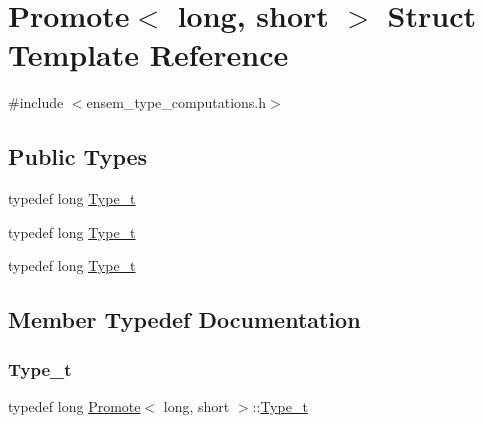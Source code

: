 \hypertarget{structPromote_3_01long_00_01short_01_4}{}\section{Promote$<$ long, short $>$ Struct Template Reference}
\label{structPromote_3_01long_00_01short_01_4}


{\ttfamily \#include $<$ensem\+\_\+type\+\_\+computations.\+h$>$}

\subsection*{Public Types}
\begin{DoxyCompactItemize}
\item 
typedef long \mbox{\hyperlink{structPromote_3_01long_00_01short_01_4_ac27097b9e5d53eee395af8cb8beb6cc1}{Type\+\_\+t}}
\item 
typedef long \mbox{\hyperlink{structPromote_3_01long_00_01short_01_4_ac27097b9e5d53eee395af8cb8beb6cc1}{Type\+\_\+t}}
\item 
typedef long \mbox{\hyperlink{structPromote_3_01long_00_01short_01_4_ac27097b9e5d53eee395af8cb8beb6cc1}{Type\+\_\+t}}
\end{DoxyCompactItemize}


\subsection{Member Typedef Documentation}
\mbox{\label{structPromote_3_01long_00_01short_01_4_ac27097b9e5d53eee395af8cb8beb6cc1}} 
\subsubsection{\texorpdfstring{Type\_t}{Type\_t}\hspace{0.1cm}{\footnotesize\ttfamily [1/3]}}
{\footnotesize\ttfamily typedef long \mbox{\hyperlink{structPromote}{Promote}}$<$ long, short $>$\+::\mbox{\hyperlink{structPromote_3_01long_00_01short_01_4_ac27097b9e5d53eee395af8cb8beb6cc1}{Type\+\_\+t}}}

\mbox{\label{structPromote_3_01long_00_01short_01_4_ac27097b9e5d53eee395af8cb8beb6cc1}} 
